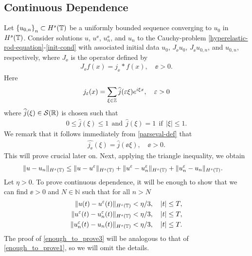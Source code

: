 \subsection{Continuous Dependence}
Let $\left\{ u_{0, n} \right\}_n \subset H^s(\mathbb{T})$ be a uniformly bounded
sequence converging to $u_0$ in $H^s(\mathbb{T})$.
Consider solutions $u $, $u^\ee$, $u^\ee_n$, and $u_n$ to the 
Cauchy-problem
\eqref{hyperelastic-rod-equation}-\eqref{init-cond}
with associated initial data $u_0$, $J_\ee u_0$,
$J_\ee u_{0,n}$, and $u_{0,n}$, respectively, where $J_\ee$ is the operator 
defined by
\begin{equation}
\label{0'u}
\begin{split}
J_\ee f(x) = j_\ee * f(x), \quad \ee>0.
\end{split}
\end{equation}
%
%
Here
\begin{equation}
\begin{split}
j_\varepsilon (x) = \sum_{\xi \in \mathbb{Z}}
\widehat{j}(\varepsilon \xi) e^{i \xi x}, \quad \varepsilon > 0
\label{parseval-def}
\end{split}
\end{equation}
where $\widehat{j}(\xi) \in \mathcal{S}(\mathbb{R})$ is chosen such that 
%
\begin{equation}
\label{0u}
\begin{split}
	 0 \le \widehat{j}(\xi) \le 1  \ \ \text{and} \ \
 \widehat{j}(\xi) = 1 \ \ \text{if} \ \ |\xi| \le 1.
\end{split}
\end{equation}
%
%
%
%
%
%
%
%
%
%
We remark that it follows immediately from \eqref{parseval-def} that
\begin{equation}
\begin{split}
	\widehat{j_\ee}(\xi)  = \widehat{j }(\ee \xi), \quad \ee > 0.
\label{widehat-def}
\end{split}
\end{equation}
This will prove
crucial later on.
%
Next, applying
the triangle inequality, we obtain
%
%
\begin{equation*}
\begin{split}
\|u - u_n\|_{H^s(\mathbb{T})}
& \le \|u - u^\varepsilon\|_{H^s(\mathbb{T})}
+ \|u^\varepsilon - u^{\varepsilon}_n \|_{H^s(\mathbb{T}) }
+  \|u^{\varepsilon}_n - u_n \|_{H^s(\mathbb{T})}.
\end{split}
\end{equation*}
%
%
Let $\eta > 0$. To prove continuous dependence, it will be enough to show that 
we can find $\ee > 0$ and $N \in \mathbb{N}$ such that for all $n > N$ 
\begin{align}
	 \|u(t) - u^\varepsilon(t)\|_{H^s(\mathbb{T})}
	& < \eta/3, \quad |t| \le T,
\label{enough_to_prove1}
\\
  \|u^\varepsilon(t) - u^{\varepsilon}_n(t)
\|_{H^s(\mathbb{T})} & < \eta/3, \quad |t| \le T,
\label{enough_to_prove2}
\\
  \|u^{\varepsilon}_n(t) - u_n(t) \|_{H^s(\mathbb{T})} & < \eta/3, \quad |t| \le T.
\label{enough_to_prove3}
\end{align}
%
%
The proof of \eqref{enough_to_prove3} will be analogous to that of 
\eqref{enough_to_prove1}, so we will omit the details.
%
%
%
%

